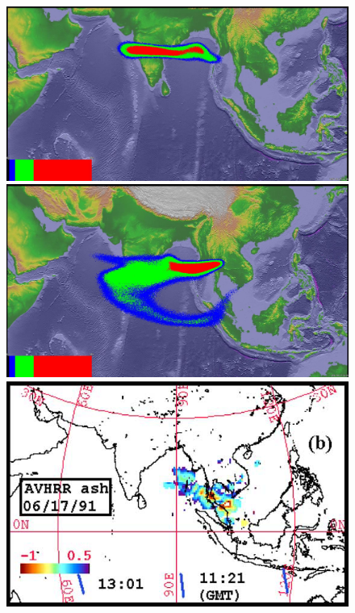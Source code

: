 \begin{figure}[!htb]
\begin{minipage}{.325 \textwidth}
    \end{minipage}%
    \\
        \begin{minipage}{.325\textwidth}
        \centering
        \includegraphics[width=0.99 \textwidth]{Chapter-7/Figures/bent-55hr-ash}
    \end{minipage}%
    \begin{minipage}{.325 \textwidth}
        \centering
        \includegraphics[width=0.99 \textwidth]{Chapter-7/Figures/SPH-Plume-55hr-ash}
    \end{minipage}%
    \begin{minipage}{.325 \textwidth}
        \centering
        \includegraphics[width=0.99 \textwidth]{Chapter-7/Figures/OB-ash-55hr-ash}

\end{minipage}
\end{figure}
